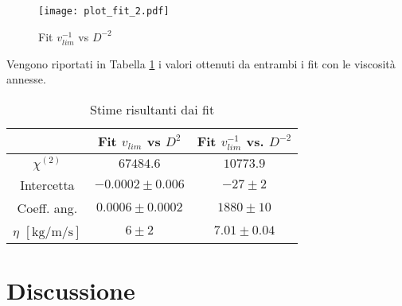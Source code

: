 \documentclass[a4paper,11pt,oneside]{article}
\begin{document}
\begin{figure}
    \centering
    \texttt{[image: plot\_fit\_2.pdf]}
    \caption{Fit $v_{lim}^{-1}$ vs $D^{-2}$}
    \label{fig:verifica_legge_2}
\end{figure}

Vengono riportati in Tabella \ref{tab:fit} i valori ottenuti da entrambi i fit con le viscosità annesse.

\begin{table}[h!] %
\centering
    \begin{tabular}{|c|c|c|} \hline
        & Fit $v_{lim}$ vs $D^{2}$ & Fit $v_{lim}^{-1}$ vs. $D^{-2}$ \\ \hline
        \rowcolor[rgb]{0.85,0.85,0.85}${\chi}^{(2)}$ & $67484.6$ & $10773.9$ \\ \hline
        Intercetta & $-0.0002 \pm 0.006$ & $-27 \pm 2$ \\ \hline
        \rowcolor[rgb]{0.85,0.85,0.85}Coeff. ang. & $0.0006 \pm 0.0002$ & $1880 \pm 10$ \\ \hline
        $\eta$ $[\si{\kilo\gram\per\metre\per\second}]$ & $6 \pm 2$ & $7.01 \pm 0.04$ \\ \hline
    \end{tabular}
\caption{Stime risultanti dai fit}
\label{tab:fit}
\end{table}


\section{Discussione}
\end{document}
